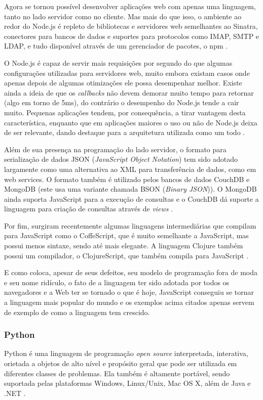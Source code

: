 \documentclass[diss]{template/setrem}
\begin{document}
Agora se tornou possível desenvolver aplicações web com apenas uma linguagem, tanto no lado servidor como no cliente. Mas mais do que isso, o ambiente ao redor do Node.js é repleto de bibliotecas e servidores web semelhantes ao Sinatra, conectores para bancos de dados e suportes para protocolos como IMAP, SMTP e LDAP, e tudo disponível através de um gerenciador de pacotes, o npm \citep{Herron2011, North2011}.

O Node.js é capaz de servir mais requisições por segundo do que algumas configurações utilizadas para servidores web, muito embora existam casos onde apenas depois de algumas otimizações ele possa desempenhar melhor. Existe ainda a ideia de que os \emph{callbacks} não devem demorar muito tempo para retornar (algo em torno de 5ms), do contrário o desempenho do Node.js tende a cair muito. Pequenas aplicações tendem, por consequência, a tirar vantagem desta característica, enquanto que em aplicações maiores o uso ou não de Node.js deixa de ser relevante, dando destaque para a arquitetura utilizada como um todo \citep{Herron2011}.

Além de sua presença na programação do lado servidor, o formato para serialização de dados JSON (\emph{JavaScript Object Notation}) tem sido adotado largamente como uma alternativa ao XML para transferência de dados, como em web services. O formato também é utilizado pelos bancos de dados CouchDB e MongoDB (este usa uma variante chamada BSON (\emph{Binary JSON})). O MongoDB ainda suporta JavaScript para a execução de consultas e o CouchDB dá suporte a linguagem para criação de consultas através de \emph{views} \citep{North2011}.

Por fim, surgiram recentemente algumas linguagens intermediárias que compilam para JavaScript como o CoffeScript, que é muito semelhante a JavaScript, mas possui menos sintaxe, sendo até mais elegante. A linguagem Clojure também possui um compilador, o ClojureScript, que também compila para JavaScript \citep{North2011}.

E como \citet{Crockford2008} coloca, apesar de seus defeitos, seu modelo de programação fora de moda e seu nome ridículo, o fato de a linguagem ter sido adotada por todos os navegadores e a Web ter se tornado o que é hoje, JavaScript conseguiu se tornar a linguagem mais popular do mundo e os exemplos acima citados apenas servem de exemplo de como a linguagem tem crescido.

\subsubsection{Python}
Python é uma linguagem de programação \emph{open source} interpretada, interativa, orietada a objetos de alto nível e propósito geral que pode ser utilizada em diferentes classes de problemas. Ela também é altamente portável, sendo suportada pelas plataformas Windows, Linux/Unix, Mac OS X, além de Java e .NET \citep{Python2012}.
\end{document}
